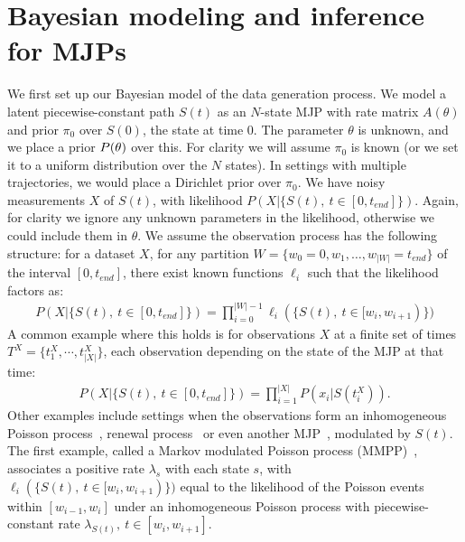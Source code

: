 \section{Bayesian modeling and inference for MJPs}
\label{sec:bayes_model}
We first set up our Bayesian model of the data generation process. 
We model a latent piecewise-constant path $S(t)$ as an $N$-state MJP with rate matrix $A(\theta)$ and prior $\pi_0$ over $S(0)$, the state at time $0$. 
The parameter $\theta$ is unknown, and we place a prior $P(\theta)$ over this. 
For clarity we will assume $\pi_0$ is known (or we set it to a uniform distribution over the $N$ states). 
In settings with multiple trajectories, we would place a Dirichlet prior over $\pi_0$. 
We have noisy measurements $X$ of $S(t)$, with likelihood $P(X|\{S(t),\ t \in [0,t_{end}]\})$.
Again, for clarity we ignore any unknown parameters in the likelihood, otherwise we could include them in $\theta$.
We assume the observation process has the following structure: for a dataset $X$, for any partition $W = \{w_0 = 0, w_1, \dotsc, w_{|W|}=t_{end}\}$ of the interval $[0,t_{end}]$, there exist known functions $\ell_i$ such that the likelihood factors as:
\begin{align}
  \label{eq:lik_factor}
  P(X|\{S(t),\ t \in [0,t_{end}]\}) = \prod_{i=0}^{|W|-1} \ell_i(\{S(t),\ t \in [w_{i},w_{i+1})\})
\end{align}
A common example where this holds is for observations $X$ at a finite set of times $T^X = \{t^X_1,\cdots, t^X_{|X|}\}$, each observation depending on the state of the MJP at that time:
\begin{align}
  \label{eq:lik_iid}
  P(X|\{S(t),\ t \in [0,t_{end}]\}) = \prod_{i=1}^{|X|} P(x_i|S(t^X_i)).
\end{align}
Other examples include settings when the observations form an inhomogeneous Poisson process~\citep{FearnSher2006}, renewal process~\citep{rao2011gaussian} or even another MJP~\citep{Nodelman+al:UAI02,RaoTeh13}, modulated by $S(t)$.
The first example, called a Markov modulated Poisson process (MMPP)~\citep{scottmmpp03}, associates a positive rate $\lambda_s$ with each state $s$, with $\ell_i(\{S(t),\ t \in [w_{i},w_{i+1})\})$ equal to the likelihood of the Poisson events within $[w_{i-1},w_i]$ under an inhomogeneous Poisson process with piecewise-constant rate $\lambda_{S(t)},\ t \in [w_{i},w_{i+1}]$.

